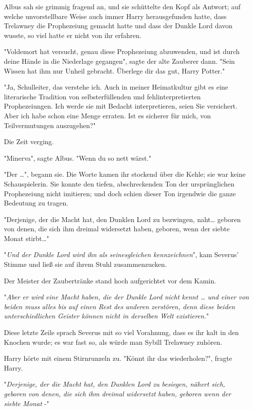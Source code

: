 {Albus sah sie grimmig fragend an, und sie schüttelte den Kopf als Antwort; auf welche unvorstellbare Weise auch immer Harry herausgefunden hatte, dass Trelawney die Prophezeiung gemacht hatte und dass der Dunkle Lord davon wusste, so viel hatte er nicht von ihr erfahren.

"Voldemort hat versucht, genau diese Prophezeiung abzuwenden, und ist durch deine Hände in die Niederlage gegangen", sagte der alte Zauberer dann. "Sein Wissen hat ihm nur Unheil gebracht. Überlege dir das gut, Harry Potter."

"Ja, Schulleiter, das verstehe ich. Auch in meiner Heimatkultur gibt es eine literarische Tradition von selbsterfüllenden und fehlinterpretierten Prophezeiungen. Ich werde sie mit Bedacht interpretieren, seien Sie versichert. Aber ich habe schon eine Menge erraten. Ist es sicherer für mich, von Teilvermutungen auszugehen?"

Die Zeit verging.

"Minerva", sagte Albus. "Wenn du so nett wärst."

"Der …", begann sie. Die Worte kamen ihr stockend über die Kehle; sie war keine Schauspielerin. Sie konnte den tiefen, abschreckenden Ton der ursprünglichen Prophezeiung nicht imitieren; und doch schien dieser Ton irgendwie die ganze Bedeutung zu tragen.

"Derjenige, der die Macht hat, den Dunklen Lord zu bezwingen, naht… geboren von denen, die sich ihm dreimal widersetzt haben, geboren, wenn der siebte Monat stirbt…"

"\emph{Und der Dunkle Lord wird ihn als seinesgleichen kennzeichnen}", kam Severus' Stimme und ließ sie auf ihrem Stuhl zusammenzucken.

Der Meister der Zaubertränke stand hoch aufgerichtet vor dem Kamin.

"\emph{Aber er wird eine Macht haben, die der Dunkle Lord nicht kennt … und einer von beiden muss alles bis auf einen Rest des anderen zerstören, denn diese beiden unterschiedlichen Geister können nicht in derselben Welt existieren.}"

Diese letzte Zeile sprach Severus mit so viel Vorahnung, dass es ihr kalt in den Knochen wurde; es war fast so, als würde man Sybill Trelawney zuhören.

Harry hörte mit einem Stirnrunzeln zu. "Könnt ihr das wiederholen?", fragte Harry.

"\emph{Derjenige, der die Macht hat, den Dunklen Lord zu besiegen, nähert sich, geboren von denen, die sich ihm dreimal widersetzt haben, geboren wenn der siebte Monat} -"

}
